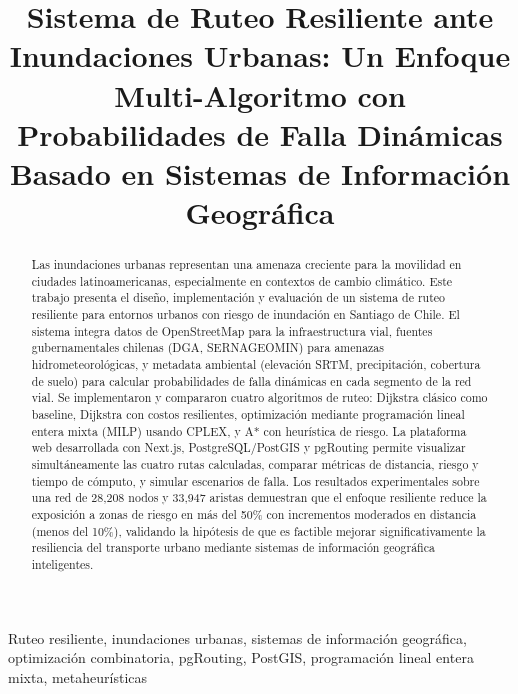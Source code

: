 \documentclass[conference]{IEEEtran}
\begin{document}
\title{Sistema de Ruteo Resiliente ante Inundaciones Urbanas: Un Enfoque Multi-Algoritmo con Probabilidades de Falla Dinámicas Basado en Sistemas de Información Geográfica}

\author{
}

\maketitle

\begin{abstract}
Las inundaciones urbanas representan una amenaza creciente para la movilidad en ciudades latinoamericanas, especialmente en contextos de cambio climático. Este trabajo presenta el diseño, implementación y evaluación de un sistema de ruteo resiliente para entornos urbanos con riesgo de inundación en Santiago de Chile. El sistema integra datos de OpenStreetMap para la infraestructura vial, fuentes gubernamentales chilenas (DGA, SERNAGEOMIN) para amenazas hidrometeorológicas, y metadata ambiental (elevación SRTM, precipitación, cobertura de suelo) para calcular probabilidades de falla dinámicas en cada segmento de la red vial. Se implementaron y compararon cuatro algoritmos de ruteo: Dijkstra clásico como baseline, Dijkstra con costos resilientes, optimización mediante programación lineal entera mixta (MILP) usando CPLEX, y A* con heurística de riesgo. La plataforma web desarrollada con Next.js, PostgreSQL/PostGIS y pgRouting permite visualizar simultáneamente las cuatro rutas calculadas, comparar métricas de distancia, riesgo y tiempo de cómputo, y simular escenarios de falla. Los resultados experimentales sobre una red de 28,208 nodos y 33,947 aristas demuestran que el enfoque resiliente reduce la exposición a zonas de riesgo en más del 50\% con incrementos moderados en distancia (menos del 10\%), validando la hipótesis de que es factible mejorar significativamente la resiliencia del transporte urbano mediante sistemas de información geográfica inteligentes.
\end{abstract}

\begin{IEEEkeywords}
Ruteo resiliente, inundaciones urbanas, sistemas de información geográfica, optimización combinatoria, pgRouting, PostGIS, programación lineal entera mixta, metaheurísticas
\end{IEEEkeywords}
\end{document}
